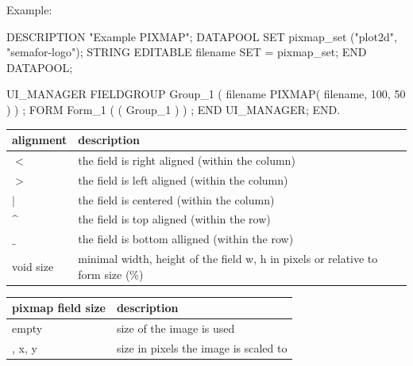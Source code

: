 \newpage
Example: \\

\begin{boxedminipage}[t]{\linewidth}
\begin{intens}
DESCRIPTION "Example PIXMAP";
DATAPOOL
  SET
    pixmap_set ("plot2d", "semafor-logo");
  STRING {EDITABLE}
    filename {SET = pixmap_set};
END DATAPOOL;

UI_MANAGER
  FIELDGROUP
    Group_1 (
        filename PIXMAP( filename, 100, 50 )
      )
   ;
  FORM
    Form_1
      ( ( Group_1 )
      )
   ;
END UI_MANAGER;
END.
\end{intens}
\end{boxedminipage}


\vspace{0.5cm}





\begin{tabularx}{\textwidth}{l|X}
alignment           & description \\ \hline
{\bfseries $<$}     & the field is right aligned (within the column) \\
{\bfseries $>$}     & the field is left aligned (within the column) \\
{\bfseries $\mid$}  & the field is centered (within the column) \\
{\bfseries $\^$}  & the field is top aligned (within the row) \\
{\bfseries $\_$}  & the field is bottom alligned (within the row) \\ \hline
void size           & minimal width, height of the field \newline
                      w, h in pixels or relative to form size (\%) \\
\end{tabularx}



\begin{tabularx}{\textwidth}{l|X}
pixmap field size   & description \\ \hline
empty               & size of the image is used \\
, x, y              & size in pixels the image is scaled to \\
\end{tabularx}

